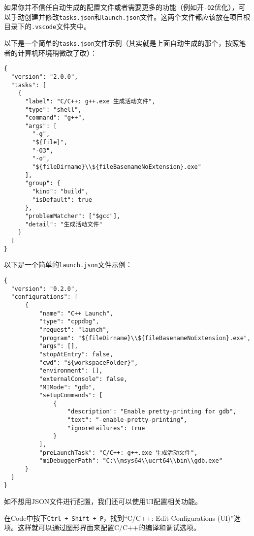 \documentclass[../main.tex]{subfiles}
\begin{document}
如果你并不信任自动生成的配置文件或者需要更多的功能（例如开\texttt{-O2}优化），可以手动创建并修改\texttt{tasks.json}和\texttt{launch.json}文件。这两个文件都应该放在项目根目录下的\texttt{.vscode}文件夹中。

以下是一个简单的\texttt{tasks.json}文件示例（其实就是上面自动生成的那个，按照笔者的计算机环境稍微改了改）：

\begin{lstlisting}
{
  "version": "2.0.0",
  "tasks": [
    {
      "label": "C/C++: g++.exe 生成活动文件",
      "type": "shell",
      "command": "g++",
      "args": [
        "-g",
        "${file}",
        "-O3",
        "-o",
        "${fileDirname}\\${fileBasenameNoExtension}.exe"
      ],
      "group": {
        "kind": "build",
        "isDefault": true
      },
      "problemMatcher": ["$gcc"],
      "detail": "生成活动文件"
    }
  ]
}
\end{lstlisting}

以下是一个简单的\texttt{launch.json}文件示例：

\begin{lstlisting}
{
  "version": "0.2.0",
  "configurations": [
      {
          "name": "C++ Launch",
          "type": "cppdbg",
          "request": "launch",
          "program": "${fileDirname}\\${fileBasenameNoExtension}.exe",
          "args": [],
          "stopAtEntry": false,
          "cwd": "${workspaceFolder}",
          "environment": [],
          "externalConsole": false,
          "MIMode": "gdb",
          "setupCommands": [
              {
                  "description": "Enable pretty-printing for gdb",
                  "text": "-enable-pretty-printing",
                  "ignoreFailures": true
              }
          ],
          "preLaunchTask": "C/C++: g++.exe 生成活动文件",
          "miDebuggerPath": "C:\\msys64\\ucrt64\\bin\\gdb.exe"
      }
  ]
}
\end{lstlisting}

如不想用JSON文件进行配置，我们还可以使用UI配置相关功能。

在Code中按下\texttt{Ctrl + Shift + P}，找到“C/C++: Edit Configurations (UI)”选项。这样就可以通过图形界面来配置C/C++的编译和调试选项。
\end{document}
